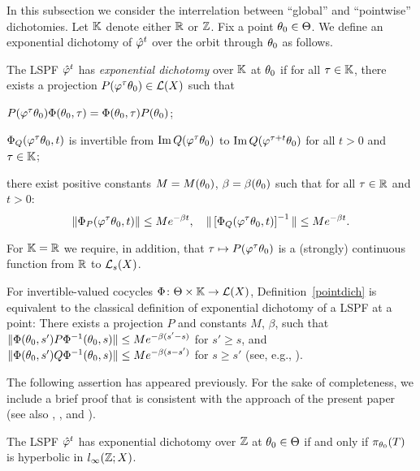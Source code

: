 In this subsection we consider the interrelation between
``global'' and ``pointwise'' dichotomies. Let ${\Bbb{K}}$ denote either
${\Bbb{R}}$ or ${\Bbb{Z}}$. Fix a point $\theta_0\in \Theta$.
We define an exponential dichotomy of ${\hat{\varphi}}^t$ over the orbit
through $\theta_0$ as  follows.

\begin{defn} \label{pointdich}
The LSPF ${\hat{\varphi}}^t$ has {\em exponential dichotomy}
over ${\Bbb{K}}$ at $\theta_0$ if for all $\tau\in{\Bbb{K}}$, there exists
a projection $P(\varphi^\tau \theta_0)\in {\cal{L}}(X)$  such that
\begin{list}{)}{}
\item  $P(\varphi^\tau \theta_0)\Phi(\theta_0,\tau) =\Phi(\theta_0,\tau)P(\theta_0)$;
\item  $\Phi_Q(\varphi^\tau \theta_0,t)$ is invertible from
       $\operatorname{Im} Q(\varphi^\tau \theta_0)$ to $\operatorname{Im} Q(\varphi^{\tau+t}\theta_0)$ for all $t>0$
       and $\tau\in{\Bbb{K}}$;
\item there exist positive constants $M=M(\theta_0)$, $\beta=\beta(\theta_0)$
such that for all $\tau\in{\Bbb{R}}$ and $t>0$:
$$\|\Phi_P(\varphi^\tau \theta_0,t) \|
\leq Me^{-\beta t},\quad
\|\left[\Phi_Q(\varphi^\tau \theta_0,t) \right]^{-1}\|
\leq Me^{-\beta t}.
$$
\end{list}
For ${\Bbb{K}}={\Bbb{R}}$ we require, in addition, that
$\tau\mapsto P(\varphi^\tau \theta_0)$ is a (strongly) continuous function
from ${\Bbb{R}}$ to ${\cal{L}}_s(X)$.
\end{defn}

For invertible-valued cocycles $\Phi\colon \Theta\times {\Bbb{K}}\to {\cal{L}}(X)$,
Definition~\ref{pointdich} is
equivalent to the classical definition of exponential
dichotomy of a LSPF at a point:  There exists a projection $P$ and
constants $M$, $\beta$, such that $\|\Phi( \theta_0,s') P\Phi^{-1}(
\theta_0,s)\| \leq Me^{-\beta (s'-s)}$ for $s'\geq s$, and
$\|\Phi( \theta_0,s') Q\Phi^{-1}( \theta_0,s)\|
\leq Me^{-\beta (s-s')}$ for $s\geq s'$
(see, e.g., \cite{SSDich}).

The following assertion has appeared previously.  For the sake of
completeness, we include a brief proof that is consistent with the
approach of the present paper (see also \cite{ChLe1},
\cite[Thm.~7.6.5]{Henry}, and \cite[Thm.~3.22]{LS}).

\begin{lem}\label{invpx} The LSPF ${\hat{\varphi}}^t$ has exponential dichotomy
over ${\Bbb{Z}}$ at $\theta_0\in \Theta$ if and only if $\pi_{\theta_0}(T)$ is
hyperbolic in $l_\infty({\Bbb{Z}};X)$.
\end{lem}


